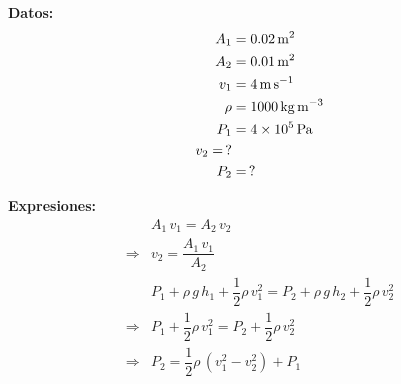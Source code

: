 \documentclass[12pt]{exam}
\begin{document}
\begin{questions}
    \vspace{0.3cm}
    \begin{minipage}[t]{0.35\linewidth}
    \textbf{Datos:}
    \begin{align*}
    A_{1} &= \SI{0.02}{\square\meter} \\
    A_{2} &= \SI{0.01}{\square\meter} \\
    v_{1} &= \SI{4}{\meter\per\second} \\
    \rho &= \SI{1000}{\kilo\gram\per\cubic\meter} \\
    P_{1} &= \SI{4d5}{\pascal} \\
    v_{2} = \, ? \\
    P_{2} &= \, ?
    \end{align*}
    \end{minipage}
    \hspace{1cm}
    \begin{minipage}[t]{0.5\linewidth}
    \textbf{Expresiones:}
    \begin{align*}
    &A_{1} \, v_{1} = A_{2} \, v_{2} \\
    \Rightarrow &v_{2} = \dfrac{A_{1} \, v_{1}}{A_{2}} \\[0.5em]
    &P_{1} + \rho \, g \, h_{1} + \dfrac{1}{2} \rho \, v_{1}^{2} = P_{2} + \rho \, g \, h_{2} + \dfrac{1}{2} \rho \, v_{2}^{2} \\
    \Rightarrow &P_{1} + \dfrac{1}{2} \rho \, v_{1}^{2} = P_{2} + \dfrac{1}{2} \rho \, v_{2}^{2} \\
    \Rightarrow &P_{2} = \dfrac{1}{2} \rho \, \left( v_{1}^{2} - v_{2}^{2} \right) + P_{1} 
    \end{align*}
    \end{minipage}


\end{questions}
\end{document}
